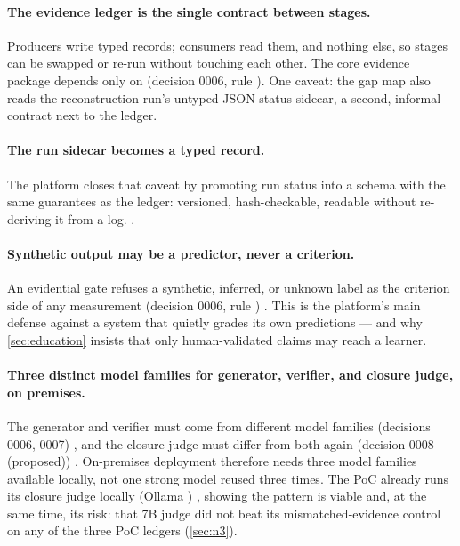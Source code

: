 \paragraph{The evidence ledger is the single contract between stages.}
Producers write typed records; consumers read them, and nothing else, so stages can be swapped or
re-run without touching each other. \evobs{} The core evidence package depends only on
 (decision 0006, rule ). \evint{} One caveat:
the gap map also reads the reconstruction run's untyped JSON status sidecar, a second, informal
contract next to the ledger.

\paragraph{The run sidecar becomes a typed record.}
The platform closes that caveat by promoting run status into a schema with the same guarantees as
the ledger: versioned, hash-checkable, readable without re-deriving it from a log. \evfut.

\paragraph{Synthetic output may be a predictor, never a criterion.}
An evidential gate refuses a synthetic, inferred, or unknown label as the criterion side of any
measurement (decision 0006, rule ) \evobs. This is the
platform's main defense against a system that quietly grades its own predictions --- and why
\cref{sec:education} insists that only human-validated claims may reach a learner.

\paragraph{Three distinct model families for generator, verifier, and closure judge, on premises.}
The generator and verifier must come from different model families (decisions 0006, 0007) \evobs,
and the closure judge must differ from both again (decision 0008 (proposed)) \evobs. On-premises
deployment therefore needs three model families available locally, not one strong model reused
three times. The PoC already runs its closure judge locally (Ollama )
\evobs, showing the pattern is viable and, at the same time, its risk: that 7B judge did not beat
its mismatched-evidence control on any of the three PoC ledgers (\cref{sec:n3}).

